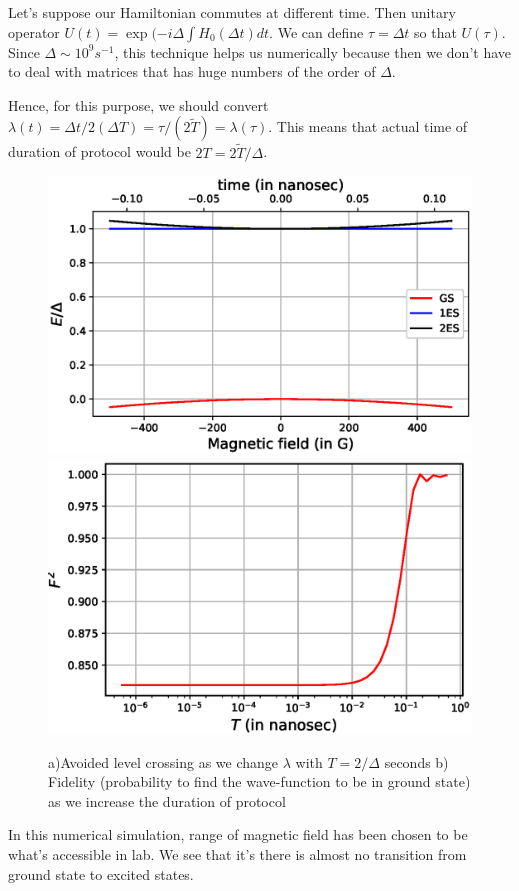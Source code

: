 \documentclass[11pt,a4paper]{article}
\begin{document}
Let's suppose our Hamiltonian commutes at different time. Then unitary operator $U (t)= \exp ( -i \Delta \int  H_0 (\Delta t) dt$. We can define $\tau= \Delta t$ so that $U( \tau)$. Since $\Delta \sim 10^9 s^{-1}$, this technique helps us numerically because then we don't have to deal with matrices that has huge numbers of the order of $\Delta$.


Hence, for this purpose, we should convert $\lambda (t)=  \Delta t/ 2(\Delta T)= \tau/(2 \tilde{T})= \lambda(\tau)$. This means that actual time of duration of protocol would be $ 2 T= 2 \tilde{T}/ \Delta$. 


\begin{figure}[!ht]
\begin{center}
\includegraphics[scale=0.5]{pics/energy_NV.eps} 
\includegraphics[scale=0.5]{pics/fidelity_NV_expt.eps}
\caption{a)Avoided level crossing as we change $\lambda$  with $  T= 2 / \Delta$ seconds b) Fidelity (probability to find the wave-function to be in ground state) as we increase the duration of protocol}
\label{fid_lz}
\end{center}
\end{figure}
In this numerical simulation, range of magnetic field has been chosen to be what's accessible in lab. We see that it's there is almost no transition from ground state to excited states.
\end{document}
